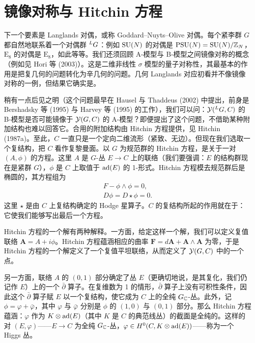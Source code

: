 \section{镜像对称与 Hitchin 方程}

下一个要素是 Langlands 对偶，或称 Goddard–Nuyts–Olive 对偶。每个紧李群 $G$ 都自然地联系着一个对偶群 ${}^{L}G$：例如 $\operatorname{SU}(N)$ 的对偶是 $\operatorname{PSU}(N)=\operatorname{SU}(N)/\mathbb{Z}_{N}$，$\mathrm{E}_{8}$ 的对偶是 $\mathrm{E}_{8}$，如此等等。我们还须回顾 A-模型与 B-模型之间镜像对称的概念（例如见 Hori 等 (2003)）。这是二维非线性 $\sigma$ 模型的量子对称性，其最基本的作用是把复几何的问题转化为辛几何的问题。几何 Langlands 对应初看并不像镜像对称的一例，但结果它确实是。

稍有一点后见之明（这个问题最早在 Hausel 与 Thaddeus (2002) 中提出，前身是 Bershadsky 等 (1995) 与 Harvey 等 (1995) 的工作），我们可以问：$\mathcal{Y}({}^{L}G,C)$ 的 B-模型是否可能镜像于 $\mathcal{Y}(G,C)$ 的 A-模型？即便提出了这个问题，不借助某种附加结构也难以回答它。合用的附加结构由 Hitchin 方程提供，见 Hitchin (1987a)。至此，$C$ 一直只是一个定向二维流形（紧致、无边）。但现在我们选取一个复结构，把 $C$ 看作复黎曼面。以 $G$ 为规范群的 Hitchin 方程，是关于一对 $(A,\phi)$ 的方程。这里 $A$ 是 $G$-丛 $E\to C$ 上的联络（我们要强调：$E$ 的结构群现在是紧群 $G$），$\phi$ 是 $C$ 上取值于 $\operatorname{ad}(E)$ 的 1-形式。Hitchin 方程模去规范群后是椭圆的，其方程组为
\begin{equation}
\begin{gathered}
F-\phi\wedge\phi=0,\\
D\phi=D\star\phi=0.
\end{gathered}
\label{eq:hitchin}
\end{equation}
这里 $\star$ 是由 $C$ 上复结构确定的 Hodge 星算子。$C$ 的复结构所起的作用就在于：它使我们能够写出最后一个方程。

Hitchin 方程的一个解有两种解释。一方面，给定这样一个解，我们可以定义复值联络 $\bm{A}=A+i\phi$。Hitchin 方程蕴涵相应的曲率 $\bm{F}=d\bm{A}+\bm{A}\wedge\bm{A}$ 为零，于是 Hitchin 方程的一个解定义了一个复值平坦联络，从而定义了 $\mathcal{Y}(G,C)$ 中的一个点。

另一方面，联络 $A$ 的 $(0,1)$ 部分确定了丛 $E$（更确切地说，是其复化，我们仍记作 $E$）上的一个 $\bar\partial$ 算子。在复维数为 1 的情形，$\bar\partial$ 算子上没有可积性条件，因此这个 $\bar\partial$ 算子赋 $E$ 以一个复结构，使它成为 $C$ 上的全纯 $G_{\mathbb{C}}$-丛。此外，记 $\phi=\varphi+\bar\varphi$，其中 $\varphi$ 与 $\bar\varphi$ 分别是 $\phi$ 的 $(1,0)$ 与 $(0,1)$ 部分。那么 Hitchin 方程蕴涵：$\varphi$ 作为 $K\otimes\operatorname{ad}(E)$（其中 $K$ 是 $C$ 的典范线丛）的截面是全纯的。这样的对 $(E,\varphi)$——$E\to C$ 为全纯 $G_{\mathbb{C}}$-丛，$\varphi\in H^{0}(C,K\otimes\operatorname{ad}(E))$——称为一个 Higgs 丛。

